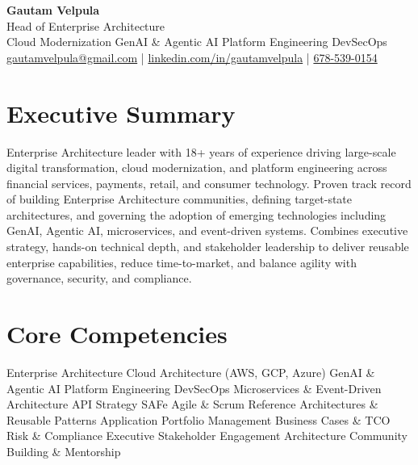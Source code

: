\documentclass[11pt]{article}
\begin{document}
\begin{center}
    {\LARGE \textbf{Gautam Velpula}} \\[4pt]
    Head of Enterprise Architecture \\[6pt]
    Cloud Modernization \textbullet{} GenAI \& Agentic AI \textbullet{} Platform Engineering \textbullet{} DevSecOps \\[6pt]
    \href{mailto:gautamvelpula@gmail.com}{gautamvelpula@gmail.com} \;|\;
    \href{https://www.linkedin.com/in/gautamvelpula}{linkedin.com/in/gautamvelpula} \;|\;
    \href{tel:6785390154}{678-539-0154}
\end{center}

\vspace{8pt}

\section*{Executive Summary}
Enterprise Architecture leader with 18+ years of experience driving large-scale digital transformation, cloud modernization, and platform engineering across financial services, payments, retail, and consumer technology. Proven track record of building Enterprise Architecture communities, defining target-state architectures, and governing the adoption of emerging technologies including GenAI, Agentic AI, microservices, and event-driven systems. Combines executive strategy, hands-on technical depth, and stakeholder leadership to deliver reusable enterprise capabilities, reduce time-to-market, and balance agility with governance, security, and compliance.

\section*{Core Competencies}
Enterprise Architecture \textbullet{} Cloud Architecture (AWS, GCP, Azure) \textbullet{} GenAI \& Agentic AI \textbullet{} Platform Engineering \textbullet{} DevSecOps \textbullet{} Microservices \& Event-Driven Architecture \textbullet{} API Strategy \textbullet{} SAFe Agile \& Scrum \textbullet{} Reference Architectures \& Reusable Patterns \textbullet{} Application Portfolio Management \textbullet{} Business Cases \& TCO \textbullet{} Risk \& Compliance \textbullet{} Executive Stakeholder Engagement \textbullet{} Architecture Community Building \& Mentorship

\end{document}
